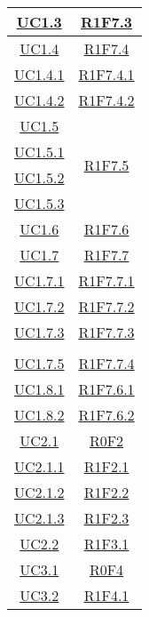 \begin{longtable}{|c|c|}
	\hyperlink{UC1.3}{UC1.3} & \hyperlink{R1F7.3}{R1F7.3} \\
	\hline
	\hyperlink{UC1.4}{UC1.4} & \hyperlink{R1F7.4}{R1F7.4} \\
	\hline
	\hyperlink{UC1.4.1}{UC1.4.1} & \hyperlink{R1F7.4.1}{R1F7.4.1}\\
	\hline
	\hyperlink{UC1.4.2}{UC1.4.2} & \hyperlink{R1F7.4.2}{R1F7.4.2}\\
	\hline
	\hyperlink{UC1.5}{UC1.5} & \multirow{4}{*}{\hyperlink{R1F7.5}{R1F7.5}}\\
	\hyperlink{UC1.5.1}{UC1.5.1} &\\
	\hyperlink{UC1.5.2}{UC1.5.2} &\\
	\hyperlink{UC1.5.3}{UC1.5.3} &\\
	\hline
	\hyperlink{UC1.6}{UC1.6} & \hyperlink{R1F7.6}{R1F7.6} \\
	\hline
	\hyperlink{UC1.7}{UC1.7} & \hyperlink{R1F7.7}{R1F7.7}\\
	\hline
	\hyperlink{UC1.7.1}{UC1.7.1} & \hyperlink{R1F7.7.1}{R1F7.7.1} \\
	\hline
	\hyperlink{UC1.7.2}{UC1.7.2} & \hyperlink{R1F7.7.2}{R1F7.7.2} \\
	\hline
	\hyperlink{UC1.7.3}{UC1.7.3} & \hyperlink{R1F7.7.3}{R1F7.7.3}\\
	\hline
	\begin{tabular}{c}
		\hyperlink{UC1.7.4}{UC1.7.4} \\ \hyperlink{UC1.7.5}{UC1.7.5}
	\end{tabular} & \hyperlink{R1F7.7.4}{R1F7.7.4}\\
	\hline
	\hyperlink{UC1.8.1}{UC1.8.1} & \hyperlink{R1F7.6.1}{R1F7.6.1} \\
	\hline
	\hyperlink{UC1.8.2}{UC1.8.2} & \hyperlink{R1F7.6.2}{R1F7.6.2} \\
	\hline
	\hyperlink{UC2.1}{UC2.1} & \hyperlink{R0F2}{R0F2}\\
	\hline
	\hyperlink{UC2.1.1}{UC2.1.1} & \hyperlink{R1F2.1}{R1F2.1}\\
	\hline
	\hyperlink{UC2.1.2}{UC2.1.2} & \hyperlink{R1F2.2}{R1F2.2}\\
	\hline
	\hyperlink{UC2.1.3}{UC2.1.3} & \hyperlink{R1F2.3}{R1F2.3}\\
	\hline
	\hyperlink{UC2.2}{UC2.2} & \hyperlink{R1F3.1}{R1F3.1}\\
	\hline
	\hyperlink{UC3.1}{UC3.1} & \hyperlink{R0F4}{R0F4}\\
	\hline
	\hyperlink{UC3.2}{UC3.2} & \hyperlink{R1F4.1}{R1F4.1}\\
	\hline

\end{longtable}
